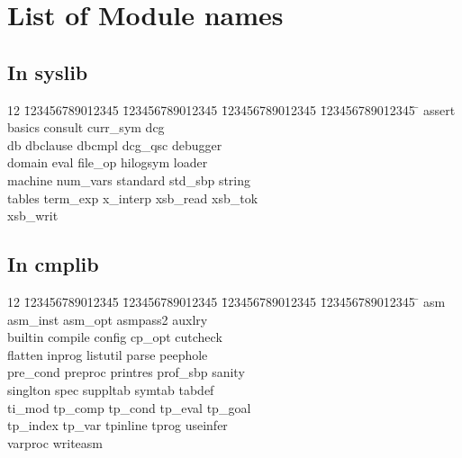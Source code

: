 \chapter{List of Module names} \label{module_names}

\section{In syslib}

\begin{tabbing}
12 \= 123456789012345 \= 123456789012345 \= 123456789012345 \= 123456789012345 \= \kill
\> assert	\> basics	\> consult 	 \> curr\_sym	\> dcg	\\
\> db		\> dbclause	\> dbcmpl	 \> dcg\_qsc	\> debugger \\
\> domain	\> eval		\> file\_op	 \> hilogsym	\> loader \\
\> machine	\> num\_vars	\> standard	\> std\_sbp	 \> string \\
\> tables	\> term\_exp	\> x\_interp	\> xsb\_read	\> xsb\_tok \\
\> xsb\_writ
\end{tabbing}


\section{In cmplib}

\begin{tabbing}
12 \= 123456789012345 \= 123456789012345 \= 123456789012345 \= 123456789012345 \= \kill
 \> asm		\> asm\_inst	\> asm\_opt	\> asmpass2	\> auxlry	\\
 \> builtin	\> compile	\> config	\> cp\_opt	\> cutcheck	\\
 \> flatten	\> inprog	\> listutil	\> parse	\> peephole	\\
 \> pre\_cond	\> preproc	\> printres	\> prof\_sbp	\> sanity	\\
 \> singlton	\> spec		\> suppltab	\> symtab	\> tabdef	\\
 \> ti\_mod	\> tp\_comp	\> tp\_cond	\> tp\_eval	\> tp\_goal	\\
 \> tp\_index	\> tp\_var	\> tpinline	\> tprog	\> useinfer	\\
 \> varproc	\> writeasm
\end{tabbing}

